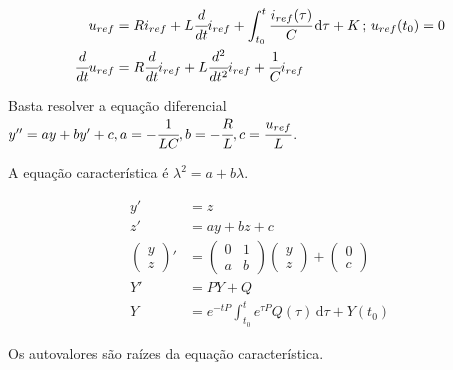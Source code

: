 \documentclass[12pt]{article}
\begin{document}
\begin{align}
 u_{ref} &= R i_{ref} + L \cfrac{d}{dt} i_{ref} + \int_{t_0}^t \cfrac{i_{ref}(\tau)}{C}\, \mathrm{d}\tau + K\,;\,u_{ref}(t_0) = 0 \\
  \cfrac{d}{dt} u_{ref} &= R \cfrac{d}{dt} i_{ref} + L \cfrac{d^2}{dt^2} i_{ref} + \cfrac{1}{C}i_{ref}
\end{align}

Basta resolver a equa\c{c}\~ao diferencial $y'' = a y + b y' + c, a = -\cfrac{1}{LC}, b = - \cfrac{R}{L}, c = \cfrac{u_{ref}}{L}$.

A equa\c{c}\~ao caracter\'istica \'e $\lambda^2 = a + b\lambda$.

\begin{align}
 y' &= z \\
 z' &= ay + bz + c \\
 \begin{pmatrix} y \\ z \end{pmatrix}' &= \begin{pmatrix} 0 & 1 \\ a & b \end{pmatrix}\begin{pmatrix} y \\ z \end{pmatrix} + \begin{pmatrix} 0 \\ c \end{pmatrix} \\
 Y' &= P Y + Q \\
 Y &= e^{-tP} \int_{t_0}^t e^{\tau P} Q(\tau)\, \mathrm{d}\tau + Y(t_0)
\end{align}

Os autovalores s\~ao ra\'izes da equa\c{c}\~ao caracter\'istica.
\end{document}
